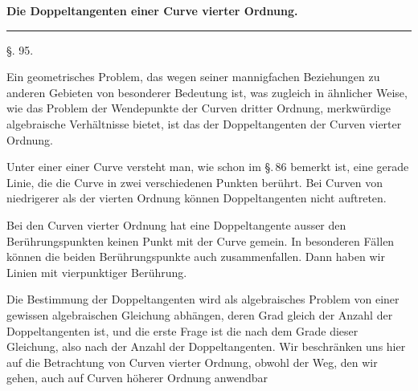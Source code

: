 \begin{center}

\textbf{Die Doppeltangenten einer Curve vierter Ordnung.}

\rule{0.3\linewidth}{0.4pt}

§. 95.

\end{center}

Ein geometrisches Problem, das wegen seiner mannigfachen Beziehungen zu anderen Gebieten von besonderer Bedeutung ist, was zugleich in ähnlicher Weise, wie das Problem der Wendepunkte der Curven dritter Ordnung, merkwürdige algebraische Verhältnisse bietet, ist das der Doppeltangenten der Curven vierter Ordnung.

Unter einer  einer Curve versteht man, wie schon im \S.\,86 bemerkt ist, eine gerade Linie, die die Curve in zwei verschiedenen Punkten berührt. Bei Curven von niedrigerer als der vierten Ordnung können Doppeltangenten nicht auftreten.

Bei den Curven vierter Ordnung hat eine Doppeltangente ausser den Berührungspunkten keinen Punkt mit der Curve gemein. In besonderen Fällen können die beiden Berührungspunkte auch zusammenfallen. Dann haben wir Linien mit vierpunktiger Berührung.

Die Bestimmung der Doppeltangenten wird als algebraisches Problem von einer gewissen algebraischen Gleichung abhängen, deren Grad gleich der Anzahl der Doppeltangenten ist, und die erste Frage ist die nach dem Grade dieser Gleichung, also nach der Anzahl der Doppeltangenten. Wir beschränken uns hier auf die Betrachtung von Curven vierter Ordnung, obwohl der Weg, den wir gehen, auch auf Curven höherer Ordnung anwendbar
